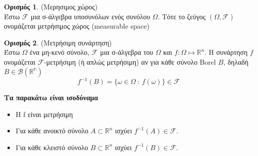\documentclass[12pt,a4paper]{article}
\theoremstyle{definition}
\numberwithin{equation}{section}
\newtheorem{orismos}{Ορισμός}
\begin{document}
\begin{orismos}{(Μερησιμος χώρος)}\\
Έστω $\mathcal{F}$ μια σ-άλγεβρα υποσυνόλων ενός συνόλου $\Omega$. Τότε το ζεύγος $(\Omega,\mathcal{F})$ ονομάζεται
μετρήσιμος χώρος (measurable space)
\end{orismos}

\begin{orismos}{(Μετρήσιμη συνάρτηση)}\\
Έστω $\Omega$ ένα μη-κενό σύνολο, $\mathcal{F}$ μια σ-άλγεβρα του $\Omega$ και $f:\Omega \mapsto \mathbb{R}^n$. Η συνάρτηση
$f$ ονομάζεται $\mathcal{F}$-μετρήσιμη (ή απλώς μετρήσιμη) αν για κάθε σύνολο Borel $B$, δηλαδή $B\in\mathcal{B}(\mathbb{R^n})$
$$ f^{-1}(B) = \{ \omega \in \Omega \: : \: f(\omega) \} \in \mathcal{F}$$
\end{orismos}

\textbf{\textbf{Τα παρακάτω είναι ισοδύναμα}}
\begin{itemize}
\item Η f είναι μετρήσιμη
\item Για κάθε ανοικτό σύνολο \(A\subset \mathbb{R}^n\) ισχύει \(f^{-1}(A) \in \mathcal{F}\).
\item Για κάθε κλειστό σύνολο \(B\subset \mathbb{R}^n\) ισχύει \(f^{-1}(B) \in \mathcal{F}\).
\end{itemize}
\end{document}
